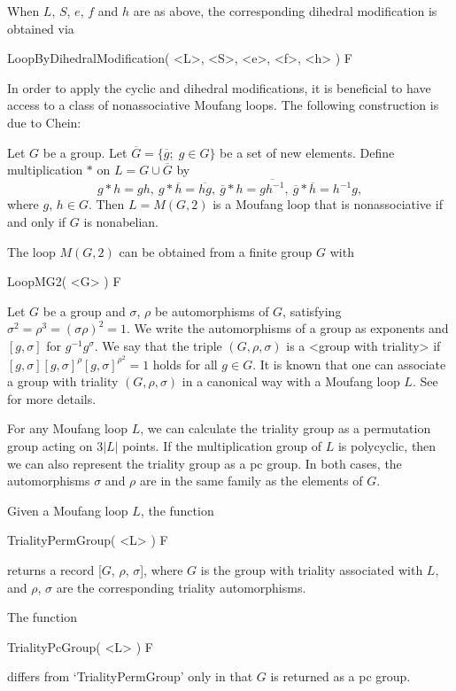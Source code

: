 When $L$, $S$, $e$, $f$ and $h$ are as above, the corresponding dihedral
modification is obtained via

\>LoopByDihedralModification( <L>, <S>, <e>, <f>, <h> ) F

In order to apply the cyclic and dihedral modifications, it is beneficial to
have access to a class of nonassociative Moufang loops. The following
construction is due to Chein:

Let $G$ be a group. Let $\overline{G}=\{\overline{g};\;g\in G\}$ be a set of
new elements. Define multiplication $\ast$ on $L=G\cup \overline{G}$ by
$$
    g\ast h = gh,\ g\ast\overline{h}=\overline{hg},\
    \overline{g}\ast h = \overline{gh^{-1}},\
    \overline{g}\ast \overline{h}=h^{-1}g,
$$
where $g$, $h\in G$. Then $L=M(G,2)$ is a Moufang loop that is nonassociative
if and only if $G$ is nonabelian.

The loop $M(G,2)$ can be obtained from a finite group $G$ with

\>LoopMG2( <G> ) F


Let $G$ be a group and $\sigma$, $\rho$ be automorphisms of $G$, satisfying
$\sigma^2 = \rho^3 = (\sigma \rho)^2 = 1$. We write the automorphisms of a
group as exponents and $[g,\sigma]$ for $g^{-1}g^\sigma$. We say that the
triple $(G,\rho,\sigma)$ is a <group with triality>
if $[g, \sigma] [g,\sigma]^\rho [g,\sigma]^{\rho^2} =1$ holds for all $g \in
G$. It is known that one can associate a group with triality $(G,\rho,\sigma)$
in a canonical way with a Moufang loop $L$. See \cite{NaVo2003} for more
details.

For any Moufang loop $L$, we can calculate the triality group as a permutation
group acting on $3|L|$ points. If the multiplication group of $L$ is
polycyclic, then we can also represent the triality group as a pc group. In
both cases, the automorphisms $\sigma$ and $\rho$ are in the same family as the
elements of $G$.

Given a Moufang loop $L$, the function

\>TrialityPermGroup( <L> ) F

returns a record [$G$, $\rho$, $\sigma$], where $G$ is the group with triality
associated with $L$, and $\rho$, $\sigma$ are the corresponding triality
automorphisms.

The function

\>TrialityPcGroup( <L> ) F

differs from `TrialityPermGroup' only in that $G$ is returned as a pc group.
